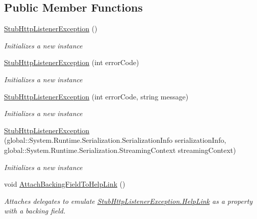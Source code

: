 \subsection*{Public Member Functions}
\begin{DoxyCompactItemize}
\item 
\hyperlink{class_system_1_1_net_1_1_fakes_1_1_stub_http_listener_exception_a48bac56adcc72d1bb22239817b9cde2e}{Stub\-Http\-Listener\-Exception} ()
\begin{DoxyCompactList}\small\item\em Initializes a new instance\end{DoxyCompactList}\item 
\hyperlink{class_system_1_1_net_1_1_fakes_1_1_stub_http_listener_exception_a3ecc451b929239109c7e28de3178c1a4}{Stub\-Http\-Listener\-Exception} (int error\-Code)
\begin{DoxyCompactList}\small\item\em Initializes a new instance\end{DoxyCompactList}\item 
\hyperlink{class_system_1_1_net_1_1_fakes_1_1_stub_http_listener_exception_a7b64108b6277a9d4bb5fc97cf949377e}{Stub\-Http\-Listener\-Exception} (int error\-Code, string message)
\begin{DoxyCompactList}\small\item\em Initializes a new instance\end{DoxyCompactList}\item 
\hyperlink{class_system_1_1_net_1_1_fakes_1_1_stub_http_listener_exception_a8059e0db7a2c6227fa16a4924cb4c3cc}{Stub\-Http\-Listener\-Exception} (global\-::\-System.\-Runtime.\-Serialization.\-Serialization\-Info serialization\-Info, global\-::\-System.\-Runtime.\-Serialization.\-Streaming\-Context streaming\-Context)
\begin{DoxyCompactList}\small\item\em Initializes a new instance\end{DoxyCompactList}\item 
void \hyperlink{class_system_1_1_net_1_1_fakes_1_1_stub_http_listener_exception_aec02a5cdf25e0bd2a524716890199f07}{Attach\-Backing\-Field\-To\-Help\-Link} ()
\begin{DoxyCompactList}\small\item\em Attaches delegates to emulate \hyperlink{class_system_1_1_net_1_1_fakes_1_1_stub_http_listener_exception_a3f92628202a10a0cd87281d7659c3b66}{Stub\-Http\-Listener\-Exception.\-Help\-Link} as a property with a backing field.\end{DoxyCompactList}\item 

\end{DoxyCompactItemize}
